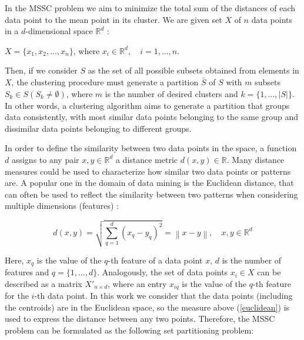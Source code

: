 In the MSSC problem we aim to minimize the total sum of the distances of each data point to the mean point in its cluster. We are given set $X$ of $n$ data points in a $d$-dimensional space $\mathbb{R}^d$ \cite{Bagirov2006}:

\begin{center}%
$X = \{x_1, x_2, ..., x_n\}$, where $x_i \in \mathbb{R}^d, \quad i = 1, ..., n.$
\end{center}

Then, if we consider $S$ as the set of all possible subsets obtained from elements in $X$, the clustering procedure must generate a partition $\bar{S}$ of $S$ with $m$ subsets $S_k \in S (S_k \neq \emptyset)$, where $m$ is the number of desired clusters and $k = \{1,...,\left | S \right |\}$. In other words, a clustering algorithm aims to generate a partition that groups data consistently, with most similar data points belonging to the same group and dissimilar data points belonging to different groups.

In order to define the similarity between two data points in the space, a function $d$ assigns to any pair $x, y \in \mathbb{R}^d$ a distance metric $d(x,y) \in \mathbb{R}$. Many distance measures could be used to characterize how similar two data points or patterns are. A popular one in the domain of data mining is the Euclidean distance, that can often be used to reflect the similarity between two patterns when considering multiple dimensions (features) \cite{Jain1999}:

\begin{equation}
\label{euclidean}
d(x,y) = \sqrt{\sum_{q=1}^{d}(x_{q} - y_{q})^2} = \left \| x - y \right \|, \quad x, y \in \mathbb{R}^d
\end{equation}

Here, $x_{q}$ is the value of the $q$-th feature of a data point $x$, $d$ is the number of features and $q = \{1,...,d\}$. Analogously, the set of data points $x_i \in X$ can be described as a matrix $X'_{n \times d}$, where an entry $x_{iq}$ is the value of the $q$-th feature for the $i$-th data point. In this work we consider that the data points (including the centroids) are in the Euclidean space, so the measure above (\ref{euclidean}) is used to express the distance between any two points. Therefore, the MSSC problem can be formulated as the following set partitioning problem:

